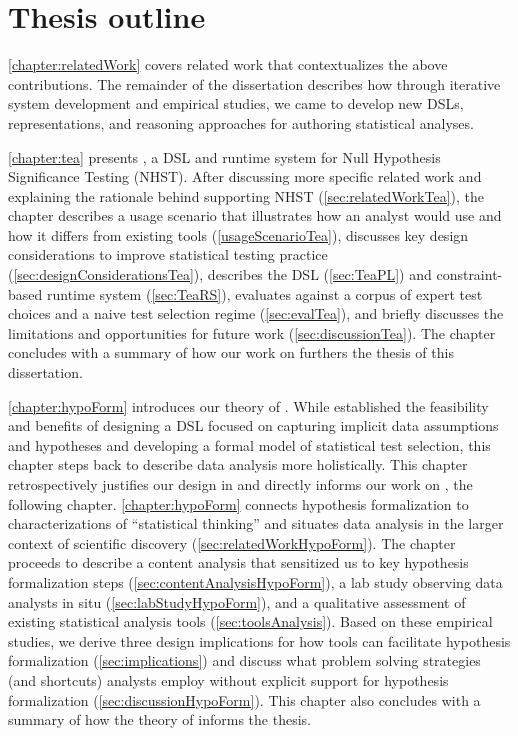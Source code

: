 
\section{Thesis outline}
\autoref{chapter:relatedWork} covers related work that contextualizes the above
contributions. The remainder of the dissertation describes how through iterative
system development and empirical studies, we came to develop new 
DSLs, representations, and reasoning approaches for authoring
statistical analyses.

\autoref{chapter:tea} presents \tea, a DSL and runtime system for Null
Hypothesis Significance Testing (NHST). After discussing more specific related work and
explaining the rationale behind supporting NHST (\autoref{sec:relatedWorkTea}), the chapter describes a
usage scenario that illustrates how an analyst would use \tea and how it differs
from existing tools (\autoref{usageScenarioTea}), discusses key design
considerations to improve statistical testing practice
(\autoref{sec:designConsiderationsTea}), describes the DSL (\autoref{sec:TeaPL})
and constraint-based runtime system (\autoref{sec:TeaRS}), evaluates \tea
against a corpus of expert test choices and a naive test selection regime
(\autoref{sec:evalTea}), and briefly discusses the limitations and opportunities
for future work (\autoref{sec:discussionTea}). The chapter concludes with a
summary of how our work on \tea furthers the thesis of this dissertation. 

\autoref{chapter:hypoForm} introduces our theory of \hypoForm. While \tea
established the feasibility and benefits of designing a DSL focused on capturing
implicit data assumptions and hypotheses and developing a formal model of
statistical test selection, this
chapter steps back to describe data analysis more holistically. This
chapter retrospectively justifies our design in \tea and directly informs our
work on \tisane, the following chapter. \autoref{chapter:hypoForm} connects hypothesis formalization to characterizations of ``statistical
thinking'' and situates data analysis in the larger context of scientific
discovery (\autoref{sec:relatedWorkHypoForm}). The chapter proceeds to
describe a content analysis that sensitized us to key hypothesis formalization
steps (\autoref{sec:contentAnalysisHypoForm}), a lab study observing data
analysts in situ (\autoref{sec:labStudyHypoForm}), and a qualitative assessment
of existing statistical analysis tools (\autoref{sec:toolsAnalysis}). Based on
these empirical studies, we derive three design implications for how tools can
facilitate hypothesis formalization (\autoref{sec:implications}) and discuss
what problem solving strategies (and shortcuts) analysts employ without explicit
support for hypothesis formalization (\autoref{sec:discussionHypoForm}). This
chapter also concludes with a summary of how the theory of \hypoForm informs the
thesis. 

